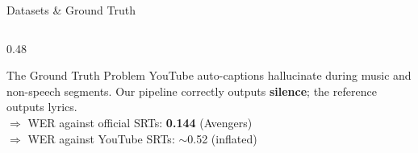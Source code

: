 \documentclass[aspectratio=169]{beamer}
\begin{document}
\begin{frame}{Datasets \& Ground Truth}
\begin{columns}[T]
\begin{column}{0.48\textwidth}
\begin{center}
      \end{center}
      \vspace{0.3cm}
      \begin{alertblock}{The Ground Truth Problem}
        YouTube auto-captions hallucinate during music and non-speech segments. Our pipeline correctly outputs \textbf{silence}; the reference outputs lyrics. \\
        $\Rightarrow$ WER against official SRTs: \textbf{0.144} (Avengers)\\
        $\Rightarrow$ WER against YouTube SRTs: $\sim$0.52 (inflated)
      \end{alertblock}
    \end{column}
  \end{columns}
\end{frame}

\end{document}
